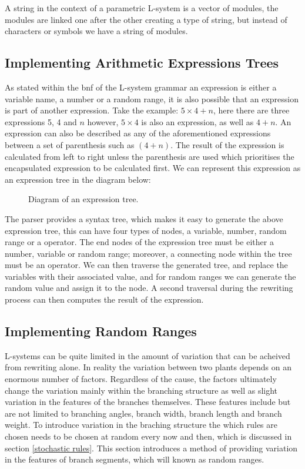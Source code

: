 A string in the context of a parametric L-system is a vector of modules, the modules are linked one after the other creating a type of string, but instead of characters or symbols we have a string of modules.

\subsection{Implementing Arithmetic Expressions Trees}

As stated within the \acrshort{bnf} of the L-system grammar an expression is either a variable name, a number or a random range, it is also possible that an expression is part of another expression. Take the example: $5 \times 4 + n$, here there are three expressions 5, 4 and $n$ however, $5 \times 4$ is also an expression, as well as $4 + n$. An expression can also be described as any of the aforementioned expressions between a set of parenthesis such as $(4+n)$. The result of the expression is calculated from left to right unless the parenthesis are used which prioritises the encapsulated expression to be calculated first. We can represent this expression as an expression tree in the diagram below:


\begin{figure}[htbp]
	{\centering
		\setlength{\fboxrule}{1pt}
		\vspace{7px}
		\caption{Diagram of an expression tree.} \label{3D rotations}
	}
\end{figure}
\FloatBarrier

\noindent
The parser provides a syntax tree, which makes it easy to generate the above expression tree, this can have four types of nodes, a variable, number, random range or a operator. The end nodes of the expression tree must be either a number, variable or random range; moreover, a connecting node within the tree must be an operator. We can then traverse the generated tree, and replace the variables with their associated value, and for random ranges we can generate the random value and assign it to the node. A second traversal during the rewriting process can then computes the result of the expression. 

\subsection{Implementing Random Ranges}

L-systems can be quite limited in the amount of variation that can be acheived from rewriting alone. In reality the variation between two plants depends on an enormous number of factors. Regardless of the cause, the factors ultimately change the variation mainly within the branching structure as well as slight variation in the features of the branches themselves. These features include but are not limited to branching angles, branch width, branch length and branch weight. To introduce variation in the braching structure the which rules are chosen needs to be chosen at random every now and then, which is discussed in section \ref{stochastic rules}. This section introduces a method of providing variation in the features of branch segments, which will known as random ranges. 

